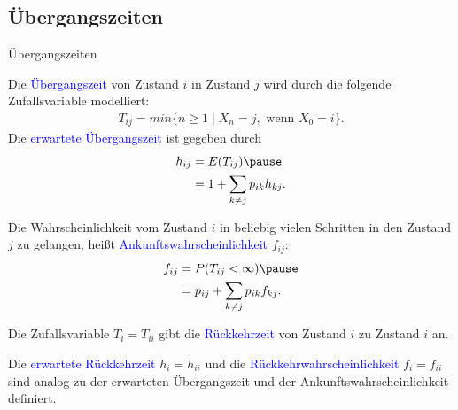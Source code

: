 \documentclass{beamer}
\def\spadding{\vspace{0.25cm}}
\def\b{\textcolor{blue}}
\begin{document}
\subsection{Übergangszeiten}
\begin{frame}{Übergangszeiten}
    \begin{definition}
        Die \b{Übergangszeit} von Zustand $i$ in Zustand $j$ wird durch die folgende Zufallsvariable modelliert:
        \begin{align*}
            T_{ij} = min \{n \geq 1 \mid X_n = j, \text{ wenn } X_0 = i\}.
        \end{align*}\pause
        Die \b{erwartete Übergangszeit} ist gegeben durch
        \begin{align*}
            h_{ij} &= E(T_{ij})\pause \\
                   &= 1 + \sum_{k \neq j} p_{ik} h_{kj}.
        \end{align*}
    \end{definition}
\end{frame}

\begin{frame}
    Die Wahrscheinlichkeit vom Zustand $i$ in beliebig vielen Schritten in den Zustand $j$ zu gelangen, heißt \b{Ankunftswahrscheinlichkeit} $f_{ij}$:
    \begin{align*}
        f_{ij} &= P(T_{ij} < \infty)\pause \\
               &= p_{ij} + \sum_{k \neq j} p_{ik} f_{kj}.
    \end{align*}\pause
    \begin{definition}
        Die Zufallsvariable $T_i = T_{ii}$ gibt die \b{Rückkehrzeit} von Zustand $i$ zu Zustand $i$ an.\pause\par\spadding
        Die \b{erwartete Rückkehrzeit} $h_i = h_{ii}$ und die \b{Rückkehrwahrscheinlichkeit} $f_i = f_{ii}$ sind analog zu der erwarteten Übergangszeit und der Ankunftswahrscheinlichkeit definiert.
    \end{definition}
\end{frame}
\end{document}
